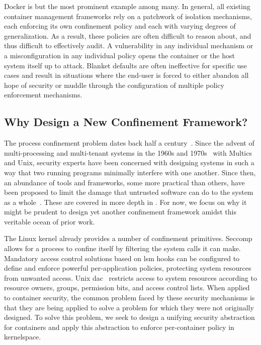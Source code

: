 Docker is but the most prominent example among many. In general, all existing container
management frameworks rely on a patchwork of isolation mechanisms, each enforcing its own
confinement policy and each with varying degrees of generalization. As a result, these
policies are often difficult to reason about, and thus difficult to effectively audit.
A vulnerability in any individual mechanism or a misconfiguration in any individual policy
opens the container or the host system itself up to attack. Blanket defaults are often
ineffective for specific use cases and result in situations where the end-user is forced to
either abandon all hope of security or muddle through the configuration of multiple policy
enforcement mechanisms.

\subsection{Why Design a New Confinement Framework?}%
\label{ss:why-new}

The process confinement problem dates back half a century~\cite{lampson1973_confinement}.
Since the advent of multi-processing and multi-tenant systems in the 1960s and
1970s~\cite{vyssotsky1965_multics, corbato1965_multics, ritchie1974_unix} with Multics and
Unix, security experts have been concerned with designing systems in such a way that two
running programs minimally interfere with one another. Since then, an abundance of tools
and frameworks, some more practical than others, have been proposed to limit the damage
that untrusted software can do to the system as
a whole~\cite{shu2016_security_isolation_study}. These are covered in more depth in
. For now, we focus on why it might be prudent to design yet another
confinement framework amidst this veritable ocean of prior work.

The Linux kernel already provides a number of confinement primitives. Seccomp allows for
a process to confine itself by filtering the system calls it can make. Mandatory access
control solutions based on \gls{lsm} hooks can be configured to define and enforce
powerful per-application policies, protecting system resources from unwanted access. Unix
\gls{dac}~\cite{ritchie1974_unix, van_oorschot2020_tools_jewels, jaeger2008_os_security,
shu2016_security_isolation_study} restricts access to system resources according to
resource owners, groups, permission bits, and access control lists. When applied to
container security, the common problem faced by these security mechanisms is that they are
being applied to solve a problem for which they were not originally designed. To solve
this problem, we seek to design a unifying security abstraction for containers and apply
this abstraction to enforce per-container policy in kernelspace.

